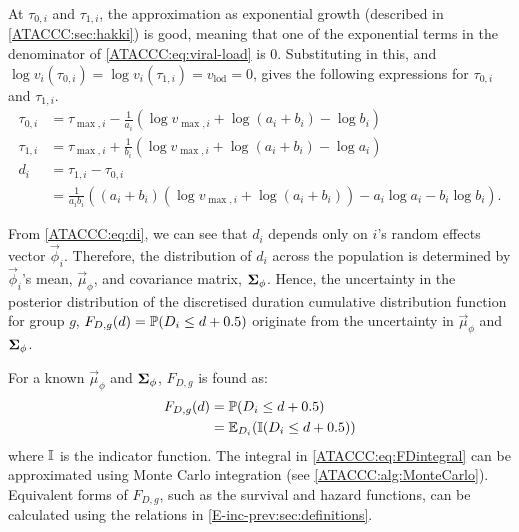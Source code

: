 \documentclass[thesis.tex]{subfiles}
\begin{document}
At $\tau_{0,i}$ and $\tau_{1,i}$, the approximation as exponential growth (described in \cref{ATACCC:sec:hakki}) is good, meaning that one of the exponential terms in the denominator of \cref{ATACCC:eq:viral-load} is 0.
Substituting in this, and $\log v_i(\tau_{0,i}) = \log v_i(\tau_{1,i}) = v_\text{lod} = 0$, gives the following expressions for $\tau_{0,i}$ and $\tau_{1,i}$.
\begin{align}
\tau_{0,i}
&= \tau_{\max,i} - \frac{1}{a_i} \left(\log v_{\max,i} + \log(a_i + b_i) - \log b_i \right) \\
\tau_{1,i}
&= \tau_{\max,i} + \frac{1}{b_i} \left(\log v_{\max,i} + \log(a_i + b_i) - \log a_i \right) \\
d_i
&= \tau_{1,i} - \tau_{0,i}  \\
&= \frac{1}{a_i b_i} \left( (a_i + b_i) (\log v_{\max,i} + \log(a_i + b_i)) - a_i \log a_i - b_i \log b_i \right).
\label{ATACCC:eq:di}
\end{align}

From \cref{ATACCC:eq:di}, we can see that $d_i$ depends only on $i$'s random effects vector $\vec{\phi}_i$.
Therefore, the distribution of $d_i$ across the population is determined by $\vec{\phi}_i$'s mean, $\vec{\mu}_\phi$, and covariance matrix, $\matr{\Sigma}_\phi$.
Hence, the uncertainty in the posterior distribution of the discretised duration cumulative distribution function for group $g$, $F_{D,g}(d) = \operatorname{\mathbb{P}}(D_i \leq d + 0.5)$ originate from the uncertainty in $\vec{\mu}_\phi$ and $\matr{\Sigma}_\phi$.

For a known $\vec{\mu}_\phi$ and $\matr{\Sigma}_\phi$, $F_{D,g}$ is found as:
\begin{align}
  F_{D,g}(d)
  &= \operatorname{\mathbb{P}}(D_i \leq d + 0.5) \\
  &= \operatorname{\mathbb{E}}_{D_i}(\operatorname{\mathbb{I}}(D_i \leq d + 0.5))
  \label{ATACCC:eq:FDintegral}
\end{align}
where $\operatorname{\mathbb{I}}$ is the indicator function.
The integral in \cref{ATACCC:eq:FDintegral} can be approximated using Monte Carlo integration (see \cref{ATACCC:alg:MonteCarlo}).
Equivalent forms of $F_{D,g}$, such as the survival and hazard functions, can be calculated using the relations in \cref{E-inc-prev:sec:definitions}.

\begin{algorithm}
  \caption{%
  Algorithm to calculate the Monte Carlo integral in \cref{ATACCC:eq:FDintegral}, producing the posterior distribution of $F_{D,g}(d)$.
  The posterior distribution is represented as a sample $F_{D,g}^{(1)}, \dots, F_{D,g}^{(N)}$.
  $\vec{\mu}_\phi^{(i)}$ and $\matr{\Sigma}_\phi^{(i)}$ denote the $i$th posterior sample of $\vec{\mu}_\phi$ and $\matr{\Sigma}_\phi$ respectively, taken from the MCMC output.
  $M$ is the number of individuals to draw, I found $M = 100,000$ produced stable estimates of the tail of $F_{D,g}(d)$ if $\dmax = 45$.
 }
 \label{ATACCC:alg:MonteCarlo}
\end{algorithm}
\end{document}
